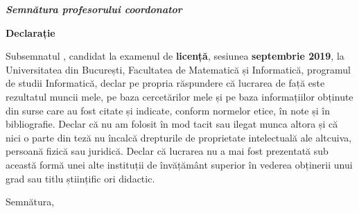 \vspace*{\fill}

\begin{flushright}
  \textbf{\emph{Semnătura profesorului coordonator}}\\
  \dottedline
\end{flushright}

\vspace{1cm}
\begin{center}
  \large
  \textbf{Declarație}
\end{center}

Subsemnatul \student, candidat la examenul de \textbf{licență}, sesiunea \textbf{septembrie 2019}, la Universitatea din București, Facultatea de Matematică și Informatică, programul de studii Informatică, declar pe propria răspundere că lucrarea de față este rezultatul muncii mele, pe baza cercetărilor mele și pe baza informațiilor obținute din surse care au fost citate și indicate, conform normelor etice, în note și în bibliografie. Declar că nu am folosit în mod tacit sau ilegat munca altora și că nici o parte din teză nu încalcă drepturile de proprietate intelectuală ale altcuiva, persoană fizică sau juridică. Declar că lucrarea nu a mai fost prezentată sub această formă unei alte instituții de învățământ superior în vederea obținerii unui grad sau titlu științific ori didactic.

\vspace*{\fill}

\begin{flushright}
Semnătura,\\
\dottedline
\end{flushright}

\pagebreak